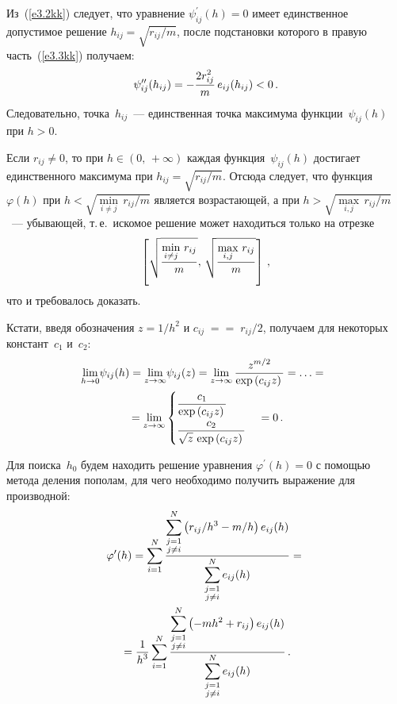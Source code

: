 \begin{multicols}{2}
      Из~(\ref{e3.2kk}) следует, что уравнение $\psi_{ij}^{\prime}(h)=0$ имеет единственное 
допустимое решение $h_{ij} =\sqrt{r_{ij}/m}$, после подстановки которого в правую 
часть~(\ref{e3.3kk}) получаем: 
      $$
      \psi_{ij}^{\prime\prime}(h_{ij}) = -\displaystyle\frac{\displaystyle 2r_{ij}^2\mathstrut}{\displaystyle m\mathstrut}\,e_{ij}(h_{ij})<0\,.
      $$
      Следовательно, точка~$h_{ij}$~--- единственная точка максимума функции~$\psi_{ij}(h)$ 
при  $h>0$.
      
      
      Если $r_{ij}\not=0$, то при $h\in (0,\,+\infty)$ каждая функция~$\psi_{ij}(h)$ достигает 
единственного максимума при $h_{ij} =\sqrt{r_{ij}/m}$. Отсюда следует, что 
функция~$\varphi(h)$ при 
$h<\sqrt{\min\limits_{i\not=j}\,r_{ij}/m}$ является возрастающей, 
а при $h>\sqrt{\max\limits_{i,j}\, r_{ij}/m}$~--- убывающей, 
т.\,е.\ искомое решение может находиться 
только на отрезке 
      \begin{equation}
      \left [ \sqrt{\displaystyle\frac{\displaystyle \min\limits_{i\not= j}\,r_{ij}\mathstrut}{\displaystyle m\mathstrut}},\,\sqrt{\displaystyle\frac{\displaystyle \max\limits_{i,j} 
\,r_{ij}\mathstrut}{\displaystyle m\mathstrut}}\right]\,,
      \label{e3.4kk}
      \end{equation}
что и требовалось доказать.
\medskip

      Кстати, введя обозначения $z=1/h^2$ и $c_{ij}\;=$\linebreak $=\;r_{ij}/2$, получаем для некоторых 
констант~$c_1$ и~$c_2$:
      \begin{multline*}
\!\!      \lim\limits_{h\rightarrow 0}\! \psi_{ij}(h) =\lim\limits_{z\rightarrow\infty}\! \psi_{ij}(z) 
=\lim\limits_{z\rightarrow \infty}\displaystyle\frac{\displaystyle z^{m/2}\mathstrut}{\displaystyle \exp\left(c_{ij} z\right)\mathstrut} =\ldots 
={}\\
{}=\lim\limits_{z\rightarrow\infty}
      \begin{cases}
      \displaystyle\frac{\displaystyle c_1\mathstrut}{\displaystyle \exp\left(c_{ij}z\right)\mathstrut}\\
      \displaystyle\frac{\displaystyle c_2\mathstrut}{\displaystyle \sqrt{z}\,\exp\left(c_{ij}z\right)\mathstrut}
      \end{cases}
      =0\,.
      \end{multline*}
      
      Для поиска~$h_0$ будем находить решение уравнения $\varphi^\prime(h)=0$ с помощью 
метода деления пополам, для чего необходимо получить выражение для производной:
      \begin{multline*}
      \varphi^\prime(h) =\sum\limits_{i=1}^N
      \displaystyle\frac{\displaystyle \sum\limits_{\substack{{j=1}\\ {j\not=i}}}^N \left ( r_{ij}/h^3-m/h\right)e_{ij}(h)\mathstrut}{\displaystyle  
\sum\limits_{\substack{{j=1}\\ {j\not=i}}}^N  e_{ij}(h)\mathstrut} ={}\\
{}=\displaystyle\frac{\displaystyle 1\mathstrut}{\displaystyle h^3\mathstrut}\sum\limits_{i=1}^N 
\displaystyle\frac{\displaystyle \sum\limits_{\substack{{j=1}\\ {j\not=i}}}^N \left( -mh^2+r_{ij}\right) 
e_{ij}(h)\mathstrut}{\displaystyle \sum\limits_{\substack{{j=1}\\ {j\not=i}}}^N e_{ij}(h)\mathstrut}\,.
      \end{multline*}
      

\end{multicols}
